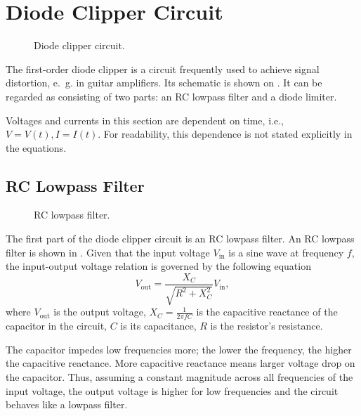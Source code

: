 \section{Diode Clipper Circuit}
\label{subsec:diode_clipper_intro}
\begin{figure}
  \centering
  
  \caption{Diode clipper circuit.}
  \label{fig:diode_clipper_circuit}
\end{figure}

The first-order diode clipper is a circuit frequently used to achieve signal distortion, e.\ g. in guitar amplifiers. Its schematic is shown on . It can be regarded as consisting of two parts: an RC lowpass filter and a diode limiter.

Voltages and currents in this section are dependent on time, i.e., $V = V(t), I= I(t)$. For readability, this dependence is not stated explicitly in the equations.

\subsection{RC Lowpass Filter}

\begin{figure}
  \centering
  
  \caption{RC lowpass filter.}
  \label{fig:rc_lowpass}
\end{figure}

The first part of the diode clipper circuit is an RC lowpass filter. An RC lowpass filter is shown in . Given that the input voltage $V_\text{in}$ is a sine wave at frequency $f$, the input-output voltage relation is governed by the following equation
\begin{equation}
  V_\text{out} = \frac{X_C}{\sqrt{R^2 + X_C^2}} V_\text{in},
  \label{eq:rc_circuit}
\end{equation}
where $V_\text{out}$ is the output voltage, $X_C=\frac{1}{2\pi f C}$ is the capacitive reactance of the capacitor in the circuit, $C$ is its capacitance, $R$ is the resistor's resistance.

The capacitor impedes low frequencies more; the lower the frequency, the higher the capacitive reactance. More capacitive reactance means larger voltage drop on the capacitor. Thus, assuming a constant magnitude across all frequencies of the input voltage, the output voltage is higher for low frequencies and the circuit behaves like a lowpass filter.


